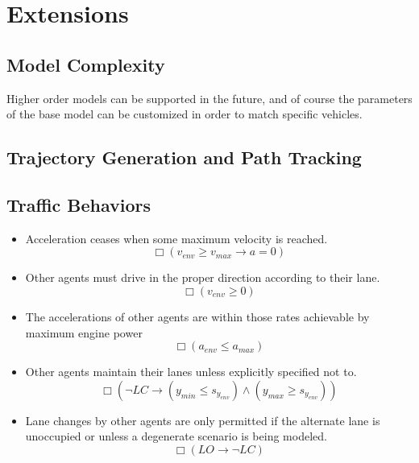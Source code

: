 \section{Extensions}
\label{sect:extensions}
\subsection{Model Complexity}
Higher order models can be supported in the future, and of course the parameters of the base model can be customized in order to match specific vehicles. 

\subsection{Trajectory Generation and Path Tracking}

\subsection{Traffic Behaviors}
\begin{itemize}
	\item Acceleration ceases when some maximum velocity is reached.
	\begin{equation}
	\Box \left( v_{env} \geq v_{max} \to a = 0 \right)
	\end{equation}
	\item Other agents must drive in the proper direction according to their lane.
	\begin{equation}
	\Box \left( v_{env} \geq 0 \right)
	\end{equation}
	\item The accelerations of other agents are within those rates achievable by maximum engine power
	\begin{equation}
	\Box \left( a_{env} \leq a_{max}\right)
	\end{equation}
	\item Other agents maintain their lanes unless explicitly specified not to.
	\begin{equation}
	\Box \left( \neg LC \to \left( y_{min} \leq s_{y_{env}} \right) \wedge \left( y_{max} \geq s_{y_{env}} \right) \right)
	\end{equation}
	\item Lane changes by other agents are only permitted if the alternate lane is unoccupied or unless a degenerate scenario is being modeled.
	\begin{equation}
	\Box \left( LO \to \neg LC \right)
	\end{equation}
\end{itemize}
